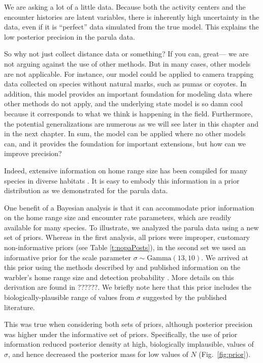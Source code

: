 We are asking a lot of a little data. Because both the activity
centers and the encounter histories are latent variables, there is
inherently high uncertainty in the data, even if it is ``perfect''
data simulated from the true model. This explains the low posterior
precision in the parula data.

So why not just collect distance data or something? If you can, great---
we are not arguing against the use of other methods. But in many
cases, other models are not applicable. For instance, our model could
be applied to camera trapping data collected on species without
natural marks, such as pumas or coyotes. In addition, this
model provides an important foundation for modeling data where other
methods do not apply, and the underlying state model is so damn cool
because it corresponds to what we think is happening in the field.
Furthermore, the potential generalizations are numerous as we
will see later in this chapter and in the next chapter. In sum, the
model can be applied where no other models can, and it provides the
foundation for important extensions, but how can we improve precision?

Indeed, extensive information on home range size has
been compiled for many species in diverse habitats %
\citep[\emph{e.g.},][]{degraaf_yamasaki:2001}. It is
easy to embody this information in a prior distribution as we
demonstrated for the parula data.


One benefit of a Bayesian analysis is that it can accommodate prior
information on the home range size and encounter rate parameters,
which are readily available for many
species. To illustrate, we analyzed the parula data using a new set of
priors. Whereas in the first analysis, all priors were
improper, customary non-informative priors (see Table \ref{t:nopaPosts}),
in the second set we used
an informative prior for the scale parameter $\sigma \sim
\mbox{Gamma}(13,10)$. We arrived at this prior using the methods
described by \citet{royle_etal:2011mee} and published
information on the warbler's home range size and detection probability
\citep{moldenhaer_regelski:1996,simons_etal:2009}. More details on this
derivation are found in ??????. We briefly note here that this prior
includes the biologically-plausible range of values from $\sigma$
suggested by the published literature.


This was true when considering
both sets of priors, although posterior precision was higher under the
informative set of priors. Specifically, the use of prior information
reduced posterior density at high, biologically implausible,
values of $\sigma$, and hence decreased the posterior mass for
low values of $N$ (Fig.~\ref{fig:prior}).





